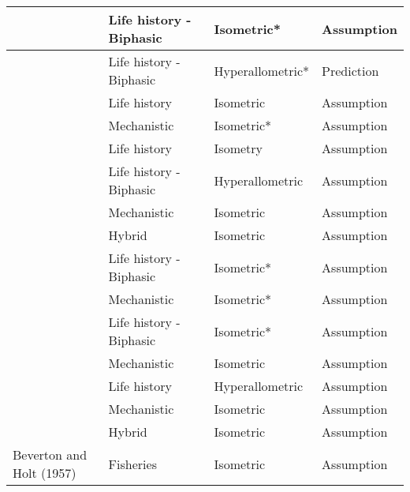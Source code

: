 \documentclass[a4paper]{article} %
\begin{document}
\begin{table}[H]
\begin{tabular}{|l|l|l|l|}
    \cite{Quince2008}                   & Life history - Biphasic   & Isometric*       & Assumption                     \\ \hline
    \cite{Quince2008b}                  & Life history - Biphasic   & Hyperallometric* & Prediction                     \\ \hline
    \cite{Pecquerie2009}                & Life history              & Isometric        & Assumption                     \\ \hline
    \cite{kooijman2010dynamic}          & Mechanistic               & Isometric*       & Assumption                     \\ \hline
    \cite{Arendt2011}                   & Life history              & Isometry         & Assumption                     \\ \hline
    \cite{Ohnishi2011}                  & Life history - Biphasic   & Hyperallometric  & Assumption                     \\ \hline
    \cite{Brunel2013}                   & Mechanistic               & Isometric        & Assumption                     \\ \hline
    \cite{Charnov2013}                  & Hybrid                    & Isometric        & Assumption                     \\ \hline
    \cite{Boukal2014}                   & Life history - Biphasic   & Isometric*       & Assumption                     \\ \hline
    \cite{Kooijman2014a}                & Mechanistic               & Isometric*       & Assumption                     \\ \hline
    \cite{Minte-Vera2016a}              & Life history - Biphasic   & Isometric*       & Assumption                     \\ \hline
    \cite{Jusup2017}                    & Mechanistic               & Isometric        & Assumption                     \\ \hline
    \cite{Mangel2017}                   & Life history              & Hyperallometric  & Assumption                     \\ \hline
    \cite{Smallegange2017}              & Mechanistic               & Isometric        & Assumption                     \\ \hline
    \cite{Audzijonyte2018}              & Hybrid                    & Isometric        & Assumption                     \\ \hline
    Beverton and Holt (1957)            & Fisheries                 & Isometric        & Assumption                     \\ \hline

\end{tabular}
\end{table}
\end{document}
